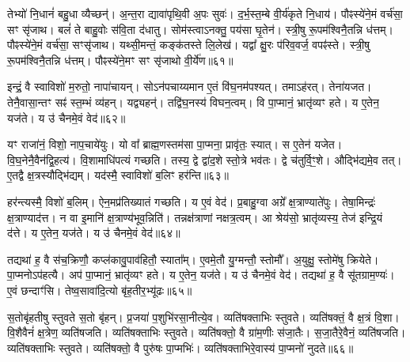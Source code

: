 तेभ्यो॑ नि॒धानं॑ बहु॒धा व्यैच्छन्॑।
अ॒न्त॒रा द्यावा॑पृथि॒वी अ॒पः सुवः॑।
द॒र्भ॒स्त॒म्बे वी॒र्य॑कृते नि॒धाय॑।
पौꣴस्ये॑ने॒मं वर्च॑सा॒ सꣳ सृ॑जाथ।
बलं॑ ते बाहु॒वोः स॑वि॒ता द॑धातु।
सोम॑स्त्वा\-ऽनक्तु॒ पय॑सा घृ॒तेन॑।
स्त्री॒षु रू॒पम॑श्विनै॒तन्नि ध॑त्तम्।
पौꣴस्ये॑ने॒मं वर्च॑सा॒ सꣳसृ॑जाथ।
यथ्सी॒मन्तं॒ कङ्क॑तस्ते लि॒लेख॑।
यद्वा᳚ क्षु॒रः प॑रिव॒वर्ज॒ वपꣴ॑स्ते।
स्त्री॒षु रू॒पम॑श्विनै॒तन्नि ध॑त्तम्।
पौꣴस्ये॑ने॒मꣳ सꣳ सृ॑जाथो वी॒र्ये॑ण॥६१॥\anuvakamend[अवा᳚स्राग्दी॒क्षा व॒शिनी॒ ह्यु॑ग्रा\-ऽद॑धाद्व॒वर्ज॒ वपꣴ॑ स्ते॒ द्वे च॑]

इन्द्रं॒ वै स्वाविशो॑ म॒रुतो॒ नापा॑चायन्।
सोऽन॑पचाय्यमान ए॒तं वि॑घ॒नम॑पश्यत्।
तमाऽह॑रत्।
तेना॑यजत।
तेनै॒वासा॒न्तꣳ सꣴ॑ स्त॒म्भं व्य॑हन्।
यद्व्यहन्॑।
तद्वि॑घ॒नस्य॑ विघन॒त्वम्।
वि पा॒प्मानं॒ भ्रातृ॑व्यꣳ हते।
य ए॒तेन॒ यज॑ते।
य उ॑ चैनमे॒वं वेद॑॥६२॥

यꣳ राजा॑नं॒ विशो॒ नाप॒चाये॑युः।
यो वा᳚ ब्राह्म॒णस्तम॑सा पा॒प्मना॒ प्रावृ॑तः॒ स्यात्।
स ए॒तेन॑ यजेत।
वि॒घ॒नेनै॒वैन॑द्वि॒हत्य॑।
वि॒शामाधि॑पत्यं गच्छति।
तस्य॒ द्वे द्वा॑द॒शे स्तो॒त्रे भव॑तः।
द्वे च॑तुर्वि॒ꣳ॒शे।
औद्भि॑द्यमे॒व तत्।
ए॒तद्वै क्ष॒त्रस्यौद्भि॑द्यम्।
यद॑स्मै॒ स्वाविशो॑ ब॒लिꣳ हर॑न्ति॥६३॥

हर॑न्त्यस्मै॒ विशो॑ ब॒लिम्।
ऐन॒मप्र॑तिख्यातं गच्छति।
य ए॒वं वेद॑।
प्र॒बाहु॒ग्वा अग्रे᳚ क्ष॒त्राण्याते॑पुः।
तेषा॒मिन्द्रः॑ क्ष॒त्राण्याद॑त्त।
न वा इ॒मानि॑ क्ष॒त्राण्य॑भूव॒न्निति॑।
तन्नक्ष॑त्राणां नक्षत्र॒त्वम्।
आ श्रेय॑सो॒ भ्रातृ॑व्यस्य॒ तेज॑ इन्द्रि॒यं द॑त्ते।
य ए॒तेन॒ यज॑ते।
य उ॑ चैनमे॒वं वेद॑॥६४॥

तद्यथा॑ ह॒ वै स॑च॒क्रिणौ॒ कप्ल॑कावु॒पाव॑हितौ॒ स्याता᳚म्।
ए॒वमे॒तौ यु॒ग्मन्तौ॒ स्तोमौ᳚।
अ॒युक्षु॒ स्तोमे॑षु क्रियेते।
पा॒प्मनो\-ऽप॑हत्यै।
अप॑ पा॒प्मानं॒ भ्रातृ॑व्यꣳ हते।
य ए॒तेन॒ यज॑ते।
य उ॑ चैनमे॒वं वेद॑।
तद्यथा॑ ह॒ वै सू॑तग्राम॒ण्यः॑।
ए॒वं छन्दाꣳ॑सि।
तेष्व॒सावा॑दि॒त्यो बृ॑ह॒तीर॒भ्यू॑ढः॥६५॥

स॒तोबृ॑हतीषु स्तुवते स॒तो बृ॑हन्।
प्र॒जया॑ प॒शुभि॑रसा॒नीत्ये॒व।
व्यति॑षक्ताभिः स्तुवते।
व्यति॑षक्तं॒ वै क्ष॒त्रं वि॒शा।
वि॒शैवैनं॑ क्ष॒त्रेण॒ व्यति॑षजति।
व्यति॑षक्ताभिः स्तुवते।
व्यति॑षक्तो॒ वै ग्रा॑म॒णीः स॑जा॒तैः।
स॒जा॒तैरे॒वैनं॒ व्यति॑षजति।
व्यति॑षक्ताभिः स्तुवते।
व्यति॑षक्तो॒ वै पुरु॑षः पा॒प्मभिः॑।
व्यति॑षक्ताभिरे॒वास्य॑ पा॒प्मनो॑ नुदते॥६६॥\anuvakamend[वेद॒ हर॑न्त्येनमे॒वं वेदा॒भ्यू॑ढः पा॒प्मभि॒रेकं॑ च]




\clearpage
{}
\setcounter{anuvakam}{0}

